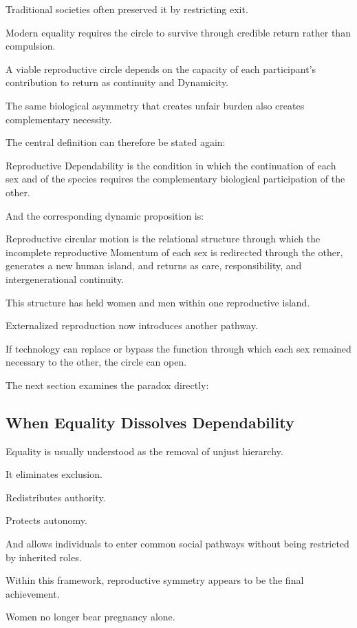 Traditional societies often preserved it by restricting exit.

Modern equality requires the circle to survive through credible return rather than compulsion.

A viable reproductive circle depends on the capacity of each participant’s contribution to return as continuity and Dynamicity.

The same biological asymmetry that creates unfair burden also creates complementary necessity.

The central definition can therefore be stated again:

Reproductive Dependability is the condition in which the continuation of each sex and of the species requires the complementary biological participation of the other.

And the corresponding dynamic proposition is:

Reproductive circular motion is the relational structure through which the incomplete reproductive Momentum of each sex is redirected through the other, generates a new human island, and returns as care, responsibility, and intergenerational continuity.

This structure has held women and men within one reproductive island.

Externalized reproduction now introduces another pathway.

If technology can replace or bypass the function through which each sex remained necessary to the other, the circle can open.

The next section examines the paradox directly:


\subsection*{\textbf{When Equality Dissolves Dependability}} 

Equality is usually understood as the removal of unjust hierarchy.

It eliminates exclusion.

Redistributes authority.

Protects autonomy.

And allows individuals to enter common social pathways without being restricted by inherited roles.

Within this framework, reproductive symmetry appears to be the final achievement.

Women no longer bear pregnancy alone.

